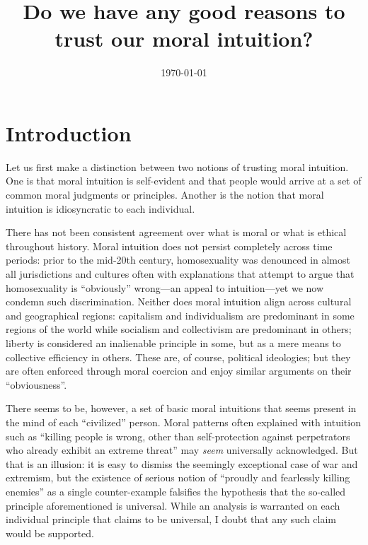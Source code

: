 \documentclass{scrartcl}
\title{Do we have any good reasons to trust our moral intuition?}
\author{\today}
\date{}
\begin{document}
\maketitle


\section{Introduction}

Let us first make a distinction between two notions of trusting moral intuition. One is that moral intuition is self-evident and that people would arrive at a set of common moral judgments or principles. Another is the notion that moral intuition is idiosyncratic to each individual.

There has not been consistent agreement over what is moral or what is ethical throughout history. Moral intuition does not persist completely across time periods: prior to the mid-20th century, homosexuality was denounced in almost all jurisdictions and cultures often with explanations that attempt to argue that homosexuality is ``obviously'' wrong---an appeal to intuition---yet we now condemn such discrimination. Neither does moral intuition align across cultural and geographical regions: capitalism and individualism are predominant in some regions of the world while socialism and collectivism are predominant in others; liberty is considered an inalienable principle in some, but as a mere means to collective efficiency in others. These are, of course, political ideologies; but they are often enforced through moral coercion and enjoy similar arguments on their ``obviousness''.

There seems to be, however, a set of basic moral intuitions that seems present in the mind of each ``civilized'' person. Moral patterns often explained with intuition such as ``killing people is wrong, other than self-protection against perpetrators who already exhibit an extreme threat'' may \emph{seem} universally acknowledged. But that is an illusion: it is easy to dismiss the seemingly exceptional case of war and extremism, but the existence of serious notion of ``proudly and fearlessly killing enemies'' as a single counter-example falsifies the hypothesis that the so-called principle aforementioned is universal. While an analysis is warranted on each individual principle that claims to be universal, I doubt that any such claim would be supported.%
\end{document}
